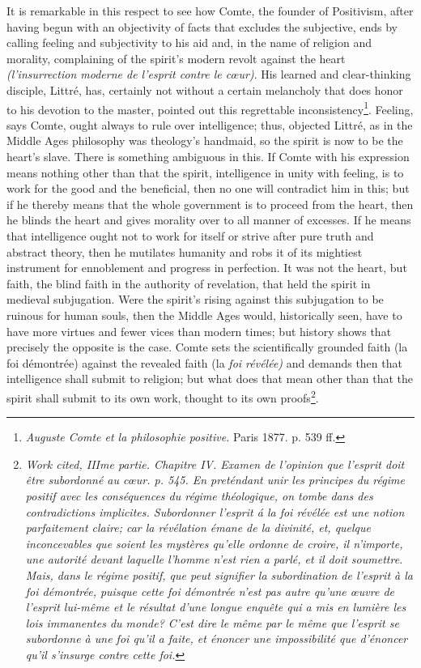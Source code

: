 \documentclass[12pt,a4paper,openany]{book}
\newcommand{\opage}[1]{\marginnote{\footnotesize\textit{[#1]}}}
\begin{document}
It is remarkable in this respect to see how Comte, the founder of Positivism, after
having begun
\setcounter{footnote}{0}%
\opage{206}with an objectivity of facts that excludes the subjective, ends by calling feeling
and subjectivity to his aid and, in the name of religion and morality, complaining of
the spirit's modern revolt against the heart \textit{(l'insurrection moderne
de l'esprit contre le cœur)}. His learned and clear-thinking disciple, Littré, has,
certainly not without a certain melancholy that does honor to his devotion to the
master, pointed out this regrettable inconsistency\footnote[1]{\textit{Auguste Comte et la philosophie positive.} Paris 1877. p. 539 ff.}. Feeling, says Comte, ought always to
rule over intelligence; thus, objected Littré, as in the Middle Ages philosophy was
theology's handmaid, so the spirit is now to be the heart's slave. There is something
ambiguous in this. If Comte with his expression means nothing other than that the
spirit, intelligence in unity with feeling, is to work for the good and the beneficial,
then no one will contradict him in this; but if he thereby means that the whole
government is to proceed from the heart, then he blinds the heart and gives morality
over to all manner of excesses. If he means that intelligence ought not to work for
itself or strive after pure truth and abstract theory, then he mutilates humanity and
robs it of its mightiest instrument for ennoblement and progress in perfection. It was
not the heart, but faith, the blind faith in the authority of revelation, that held the
spirit in medieval subjugation. Were the spirit's rising against this subjugation to be
ruinous for human souls, then the Middle Ages would, historically seen, have to have
more virtues and fewer vices than modern times; but history shows that precisely the
opposite is the case. Comte sets the scientifically grounded faith (la foi démontrée)
against the revealed faith (la \textit{foi révélée)} and demands then that intelligence
shall submit to religion; but what does that mean other than that the spirit shall
submit to its own work, thought to its own proofs\footnote[2]{\textit{Work cited, IIIme partie. Chapitre IV. Examen de l'opinion que l'esprit doit être subordonné au cœur. p. 545. En preténdant unir les principes du régime positif avec les conséquences du régime théologique, on tombe dans des contradictions implicites. Subordonner l'esprit á la foi révélée est une notion parfaitement claire; car la révélation émane de la divinité, et, quelque inconcevables que soient les mystères qu'elle ordonne de croire, il n'importe, une autorité devant laquelle l'homme n'est rien a parlé, et il doit soumettre. Mais, dans le régime positif, que peut signifier la subordination de l'esprit à la foi démontrée, puisque cette foi démontrée n'est pas autre qu'une œuvre de l'esprit lui-même et le résultat d'une longue enquête qui a mis en lumière les lois immanentes du monde? C'est dire le même par le même que l'esprit se subordonne à une foi qu'il a faite, et énoncer une impossibilité que d'énoncer qu'il s'insurge contre cette foi.}}.
\end{document}
